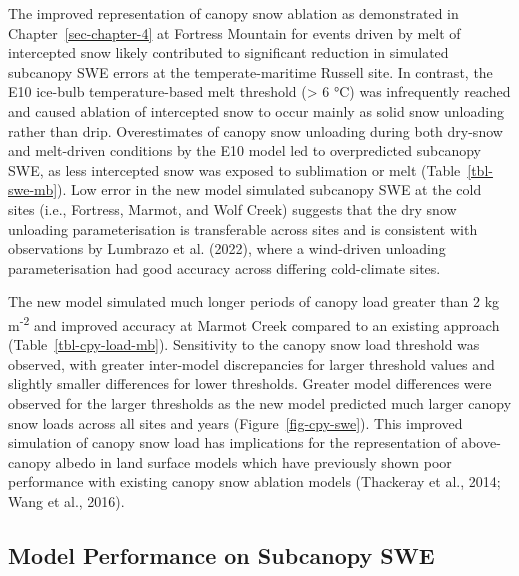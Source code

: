 \documentclass[
  letterpaper,
]{tex/uofsthesis-cs}
\begin{document}
The improved representation of canopy snow ablation as demonstrated in
Chapter~\ref{sec-chapter-4} at Fortress Mountain for events driven by
melt of intercepted snow likely contributed to significant reduction in
simulated subcanopy SWE errors at the temperate-maritime Russell site.
In contrast, the E10 ice-bulb temperature-based melt threshold
(\textgreater{} 6 °C) was infrequently reached and caused ablation of
intercepted snow to occur mainly as solid snow unloading rather than
drip. Overestimates of canopy snow unloading during both dry-snow and
melt-driven conditions by the E10 model led to overpredicted subcanopy
SWE, as less intercepted snow was exposed to sublimation or melt
(Table~\ref{tbl-swe-mb}). Low error in the new model simulated subcanopy
SWE at the cold sites (i.e., Fortress, Marmot, and Wolf Creek) suggests
that the dry snow unloading parameterisation is transferable across
sites and is consistent with observations by Lumbrazo et al. (2022),
where a wind-driven unloading parameterisation had good accuracy across
differing cold-climate sites.

The new model simulated much longer periods of canopy load greater than
2 kg m\textsuperscript{-2} and improved accuracy at Marmot Creek
compared to an existing approach (Table~\ref{tbl-cpy-load-mb}).
Sensitivity to the canopy snow load threshold was observed, with greater
inter-model discrepancies for larger threshold values and slightly
smaller differences for lower thresholds. Greater model differences were
observed for the larger thresholds as the new model predicted much
larger canopy snow loads across all sites and years
(Figure~\ref{fig-cpy-swe}). This improved simulation of canopy snow load
has implications for the representation of above-canopy albedo in land
surface models which have previously shown poor performance with
existing canopy snow ablation models (Thackeray et al., 2014; Wang et
al., 2016).

\subsection{Model Performance on Subcanopy
SWE}\label{model-performance-on-subcanopy-swe}
\end{document}
